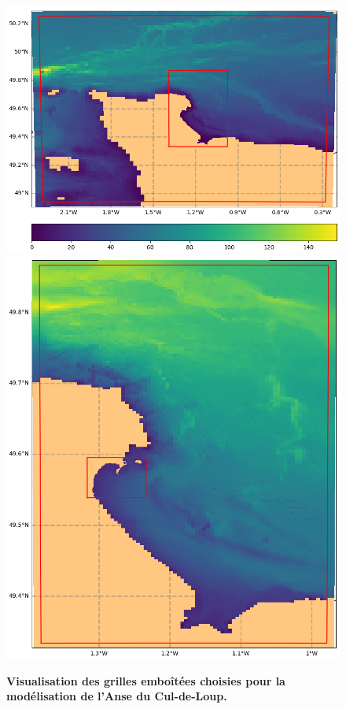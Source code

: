 \documentclass[10pt,a4paper,titlepage]{article}
\begin{document}
\begin{figure}[h!]
    \centering
    \includegraphics[scale=0.4]{../images/croco_grd.nc.1_V2.png}
    \includegraphics[scale=0.27]{../images/croco_grd.nc.2_V2.png}
    \caption{
        \textbf{Visualisation des grilles emboîtées choisies pour la modélisation de l'Anse du Cul-de-Loup.}
}
\end{figure}
\end{document}
